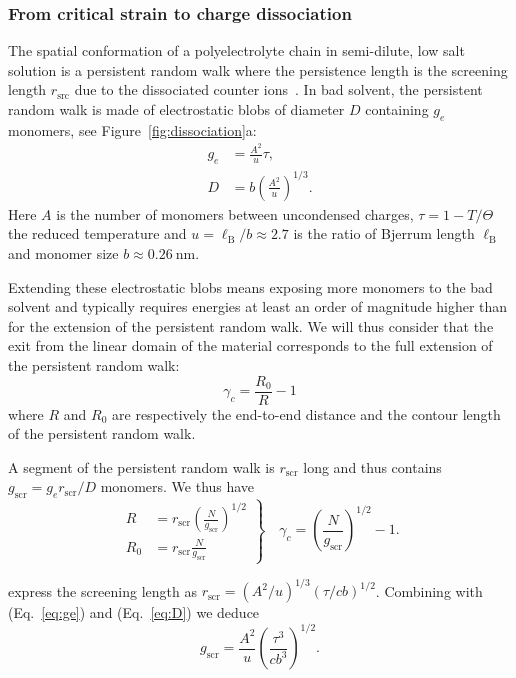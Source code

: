 \documentclass[journal=jacsat,manuscript=article]{achemso}
\begin{document}
\subsubsection{From critical strain to charge dissociation}

The spatial conformation of a polyelectrolyte chain in semi-dilute, low salt solution is a persistent random walk where the persistence length is the screening length $r_\mathrm{src}$ due to the dissociated counter ions~\cite{Rubinstein1996}. In bad solvent, the persistent random walk is made of electrostatic blobs of diameter $D$ containing $g_e$ monomers, see Figure~\ref{fig:dissociation}a:
\begin{align}
g_e &= \frac{A^2}{u}\tau\label{eq:ge},\\
D &= b \left(\frac{A^2}{u}\right)^{1/3}\label{eq:D}.
\end{align}
Here $A$ is the number of monomers between uncondensed charges, $\tau = 1 - T/\Theta$ the reduced temperature and $u = \ell_\mathrm{B}/b \approx 2.7$ is the ratio of Bjerrum length $\ell_\mathrm{B}$ and monomer size $b\approx \SI{0.26}{\nano\metre}$. 

Extending these electrostatic blobs means exposing more monomers to the bad solvent and typically requires energies at least an order of magnitude higher than for the extension of the persistent random walk. We will thus consider that the exit from the linear domain of the material corresponds to the full extension of the persistent random walk:
\begin{equation}
\gamma_c = \frac{R_0}{R} - 1
\end{equation}
where $R$ and $R_0$ are respectively the end-to-end distance and the contour length of the persistent random walk.

A segment of the persistent random walk is $r_\mathrm{scr}$ long and thus contains $g_\mathrm{scr} = g_e r_\mathrm{scr}/D$ monomers. We thus have
\begin{equation}
\left. \begin{array}{ll}
R &= r_\mathrm{scr} \left(\frac{N}{g_\mathrm{scr}}\right)^{1/2}\\
R_0 &= r_\mathrm{scr} \frac{N}{g_\mathrm{scr}}
\end{array}\right\rbrace\quad
\gamma_c = \left(\frac{N}{g_\mathrm{scr}}\right)^{1/2} -1\label{eq:gamma0}.
\end{equation}

\citeauthor{Rubinstein1996} express the screening length as
$r_\mathrm{scr} = \left(A^2 / u\right)^{1/3} \left(\tau /cb \right)^{1/2}$. Combining with (Eq.~\ref{eq:ge}) and (Eq.~\ref{eq:D}) we deduce
\begin{equation}
g_\mathrm{scr} = \frac{A^2}{u} \left(\frac{\tau^3}{c b^3}\right)^{1/2}\label{eq:gscr}.
\end{equation}
\end{document}
